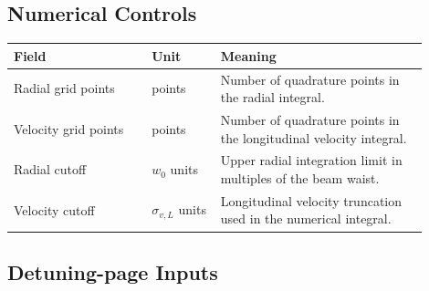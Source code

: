 \documentclass[11pt,a4paper]{article}
\begin{document}
\subsection{Numerical Controls}

\begin{longtable}{>{\raggedright\arraybackslash}p{0.30\linewidth} >{\raggedright\arraybackslash}p{0.15\linewidth} >{\raggedright\arraybackslash}p{0.45\linewidth}}
\toprule
Field & Unit & Meaning \\
\midrule
Radial grid points & points & Number of quadrature points in the radial integral. \\
Velocity grid points & points & Number of quadrature points in the longitudinal velocity integral. \\
Radial cutoff & $w_0$ units & Upper radial integration limit in multiples of the beam waist. \\
Velocity cutoff & $\sigma_{v,L}$ units & Longitudinal velocity truncation used in the numerical integral. \\
\bottomrule
\end{longtable}

\subsection{Detuning-page Inputs}
\end{document}
